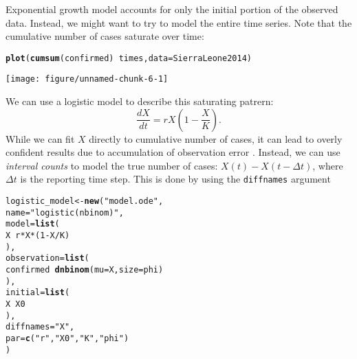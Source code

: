 \documentclass{article}\usepackage[]{graphicx}\usepackage[]{color}
\makeatletter
\def\maxwidth{ %
  \ifdim\Gin@nat@width>\linewidth
    \linewidth
  \else
    \Gin@nat@width
  \fi
}
\newcommand{\hlnum}[1]{\textcolor[rgb]{0.686,0.059,0.569}{#1}}%
\newcommand{\hlstr}[1]{\textcolor[rgb]{0.192,0.494,0.8}{#1}}%
\newcommand{\hlopt}[1]{\textcolor[rgb]{0,0,0}{#1}}%
\newcommand{\hlstd}[1]{\textcolor[rgb]{0.345,0.345,0.345}{#1}}%
\newcommand{\hlkwb}[1]{\textcolor[rgb]{0.69,0.353,0.396}{#1}}%
\newcommand{\hlkwc}[1]{\textcolor[rgb]{0.333,0.667,0.333}{#1}}%
\newcommand{\hlkwd}[1]{\textcolor[rgb]{0.737,0.353,0.396}{\textbf{#1}}}%
\newenvironment{kframe}{%
 \def\at@end@of@kframe{}%
 \ifinner\ifhmode%
  \def\at@end@of@kframe{\end{minipage}}%
  \begin{minipage}{\columnwidth}%
 \fi\fi%
 \def\FrameCommand##1{\hskip\@totalleftmargin \hskip-\fboxsep
 \colorbox{shadecolor}{##1}\hskip-\fboxsep
     \hskip-\linewidth \hskip-\@totalleftmargin \hskip\columnwidth}%
 \MakeFramed {\advance\hsize-\width
   \@totalleftmargin\z@ \linewidth\hsize
   \@setminipage}}%
 {\par\unskip\endMakeFramed%
 \at@end@of@kframe}
\newenvironment{knitrout}{}{} %
\makeatother
\begin{document}
Exponential growth model accounts for only the initial portion of
the observed data. Instead, we might want to try to model the entire
time series. Note that the cumulative number of cases saturate over time:
\begin{knitrout}
\color{fgcolor}\begin{kframe}
\begin{alltt}
\hlkwd{plot}\hlstd{(}\hlkwd{cumsum}\hlstd{(confirmed)} \hlopt{~} \hlstd{times,} \hlkwc{data}\hlstd{=SierraLeone2014)}
\end{alltt}
\end{kframe}
\texttt{[image: figure/unnamed-chunk-6-1]} 

\end{knitrout}
We can use a logistic model to describe this saturating patrern:
\begin{equation}
\frac{dX}{dt} = r X \left(1 - \frac{X}{K}\right).
\end{equation}
While we can fit $X$ directly to cumulative number of cases, it can lead to
overly confident results due to accumulation of observation error \citep{king2015avoidable}.
Instead, we can use \emph{interval counts} to model the true number of cases:
$X(t) - X(t - \Delta t)$, where $\Delta t$ is the reporting time step.
This is done by using the \texttt{diffnames} argument
\begin{knitrout}
\color{fgcolor}\begin{kframe}
\begin{alltt}
\hlstd{logistic_model} \hlkwb{<-} \hlkwd{new}\hlstd{(}\hlstr{"model.ode"}\hlstd{,}
    \hlkwc{name}\hlstd{=}\hlstr{"logistic (nbinom)"}\hlstd{,}
    \hlkwc{model}\hlstd{=}\hlkwd{list}\hlstd{(}
        \hlstd{X} \hlopt{~} \hlstd{r} \hlopt{*} \hlstd{X} \hlopt{*} \hlstd{(}\hlnum{1} \hlopt{-} \hlstd{X}\hlopt{/}\hlstd{K)}
    \hlstd{),}
    \hlkwc{observation}\hlstd{=}\hlkwd{list}\hlstd{(}
        \hlstd{confirmed} \hlopt{~} \hlkwd{dnbinom}\hlstd{(}\hlkwc{mu}\hlstd{=X,} \hlkwc{size}\hlstd{=phi)}
    \hlstd{),}
    \hlkwc{initial}\hlstd{=}\hlkwd{list}\hlstd{(}
        \hlstd{X} \hlopt{~} \hlstd{X0}
    \hlstd{),}
    \hlkwc{diffnames}\hlstd{=}\hlstr{"X"}\hlstd{,}
    \hlkwc{par}\hlstd{=}\hlkwd{c}\hlstd{(}\hlstr{"r"}\hlstd{,} \hlstr{"X0"}\hlstd{,} \hlstr{"K"}\hlstd{,} \hlstr{"phi"}\hlstd{)}
\hlstd{)}
\end{alltt}
\end{kframe}
\end{knitrout}
\end{document}
